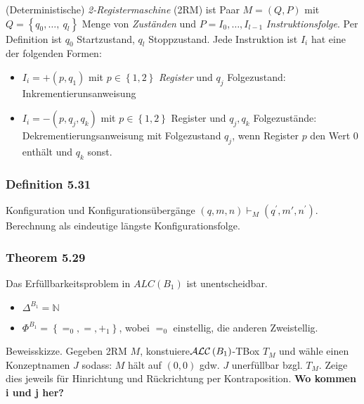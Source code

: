 (Deterministische) \emph{2-Registermaschine} (2RM) ist Paar
$M = \left( Q,P \right)$ mit
$Q = \left\{ q_{0},\ldots,\ q_{l} \right\}$ Menge von \emph{Zuständen}
und $P = I_{0},\ldots,I_{l - 1}$ \emph{Instruktionsfolge}. Per
Definition ist $q_{0}$ Startzustand, $q_{l}$ Stoppzustand. Jede
Instruktion ist $I_{i}$ hat eine der folgenden Formen:

\begin{itemize}
\item
  $I_{i} = + (p,q_1)$ mit $p \in \left\{ 1,2 \right\}$
  \emph{Register} und $q_{j}$ Folgezustand: Inkrementierunsanweisung
\item
  $I_{i} = - (p,q_{j},q_{k})$ mit $p \in \left\{ 1,2 \right\}$
  Register und $q_{j},q_{k}$ Folgezustände: Dekrementierungsanweisung
  mit Folgezustand $q_{j}$, wenn Register $p$ den Wert $0$ enthält
  und $q_{k}$ sonst.
\end{itemize}

\subsubsection{Definition 5.31}\label{definition-5.31}

Konfiguration und Konfigurationsübergänge
$\left( q,m,n \right) \vdash_{M}(q^{'},m',n^{'})$. Berechnung als
eindeutige längste Konfigurationsfolge.

\subsubsection{Theorem 5.29}\label{theorem-5.29}

Das Erfüllbarkeitsproblem in $ALC(B_1)$ ist unentscheidbar.

\begin{itemize}
\item
  $\Delta^{B_1}\mathbb{= N}$
\item
  $\Phi^{B_1} = \left\{ =_{0}, = , +_1 \right\}$, wobei $=_{0}$
  einstellig, die anderen Zweistellig.
\end{itemize}

Beweisskizze. Gegeben 2RM $M$,
konstuiere$\text {$\mathcal{A}\mathcal{L}\mathcal{C}$}\left( B_1 \right)$-TBox $T_{M}$ und wähle
einen Konzeptnamen $J$ sodass: $M$ hält auf $\left( 0,0 \right)$
gdw. $J$ unerfüllbar bzgl. $T_{M}$. Zeige dies jeweils für
Hinrichtung und Rückrichtung per Kontraposition. \textbf{Wo kommen i und
j her?}
